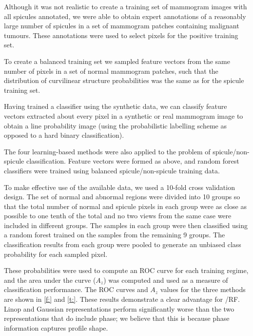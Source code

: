 \label{s:exp_realmamm_spicule_classification}
%
Although it was not realistic to create a training set of mammogram images with all spicules annotated, we were able to obtain expert annotations of a reasonably large number of spicules in a set of mammogram patches containing malignant tumours. These annotations were used to select pixels for the positive training set. 

To create a balanced training set we sampled feature vectors from the same number of pixels in a set of normal mammogram patches, such that the distribution of curvilinear structure probabilities was the same as for the spicule training set.

Having trained a classifier using the synthetic data, we can classify feature vectors extracted about every pixel in a synthetic or real mammogram image to obtain a line probability image (using the probabilistic labelling scheme as opposed to a hard binary classification).

The four learning-based methods were also applied to the problem of spicule/non-spicule classification. Feature vectors were formed as above, and random forest classifiers were trained using balanced spicule/non-spicule training data. 

To make effective use of the available data, we used a 10-fold cross validation design. The set of normal and abnormal regions were divided into 10 groups so that the total number of normal and spicule pixels in each group were as close as possible to one tenth of the total and no two views from the same case were included in different groups. The samples in each group were then classified using a random forest trained on the samples from the remaining 9 groups. The classification results from each group were pooled to generate an unbiased class probability for each sampled pixel. 

These probabilities were used to compute an ROC curve for each training regime, and the area under the curve ($A_z$) was computed and used as a measure of classification performance. The ROC curves and $A_z$ values for the three methods are shown in \ref{f:} and \ref{t:}. These results demonstrate a clear advantage for \dtcwt{}/RF. Linop and Gaussian representations perform significantly worse than the two representations that do include phase; we believe that this is because phase information captures profile shape.

